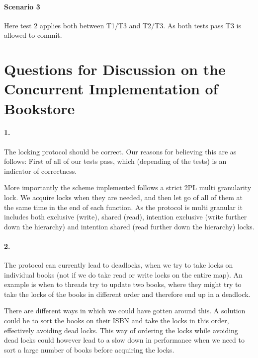 \documentclass[a4paper, 11pt]{article}
\begin{document}

\paragraph{Scenario 3} %
\label{par:scenario_3}

Here test 2 applies both between T1/T3 and T2/T3. As both tests pass T3 is allowed to commit.



\section{Questions for Discussion on the Concurrent Implementation of Bookstore} %
\label{sec:questions_for_discussion_on_the_concurrent_implementation_of_bookstore}

\paragraph{1.} %
\label{par:1_}

The locking protocol should be correct. Our reasons for believing this are as follows: First of all of our tests pass, which (depending of the tests) is an indicator of correctness.

More importantly the scheme implemented follows a strict 2PL multi granularity lock. We acquire locks when they are needed, and then let go of all of them at the same time in the end of each function. As the protocol is multi granular it includes both exclusive (write), shared (read), intention exclusive (write further down the hierarchy) and intention shared (read further down the hierarchy) locks.


\paragraph{2.} %
\label{par:2_}

The protocol can currently lead to deadlocks, when we try to take locks on individual books (not if we do take read or write locks on the entire map). An example is when to threads try to update two books, where they might try to take the locks of the books in different order and therefore end up in a deadlock.

There are different ways in which we could have gotten around this. A solution could be to sort the books on their ISBN and take the locks in this order, effectively avoiding dead locks. This way of ordering the locks while avoiding dead locks could however lead to a slow down in performance when we need to sort a large number of books before acquiring the locks.
\end{document}
